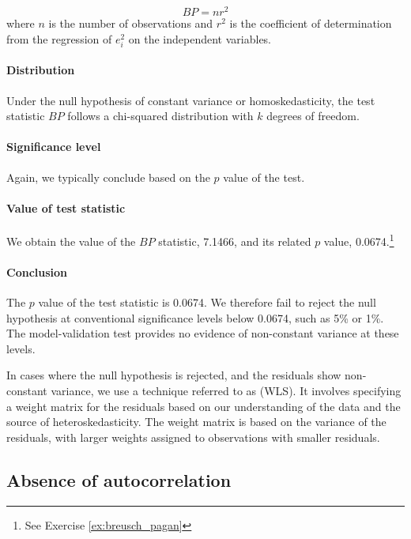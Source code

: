 \begin{equation}
  BP = nr^2
\end{equation}
where $n$ is the number of observations and $r^2$ is the coefficient of determination from the regression of $e_i^2$ on the independent variables.

\paragraph{Distribution} Under the null hypothesis of constant variance or homo\-skedasticity, the test statistic $BP$ follows a chi-squared distribution with $k$ degrees of freedom.

\paragraph{Significance level} Again, we typically conclude based on the $p$ value of the test.

\paragraph{Value of test statistic} We obtain the value of the $BP$ statistic, 7.1466, and its related $p$ value, 0.0674.\footnote{See Exercise \ref{ex:breusch_pagan}}

\paragraph{Conclusion}

The $p$ value of the test statistic is 0.0674. We therefore fail to reject the null hypothesis at conventional significance levels below 0.0674, such as 5\% or 1\%. The model-validation test provides no evidence of non-constant variance at these levels.

\bigskip
In cases where the null hypothesis is rejected, and the residuals show non-constant variance, we use a technique referred to as  (WLS). It involves specifying a weight matrix for the residuals based on our understanding of the data and the source of heteroskedasticity. The weight matrix is based on the variance of the residuals, with larger weights assigned to observations with smaller residuals. 


\subsection{Absence of autocorrelation} %
\label{sub:absence_of_autocorrelation}

